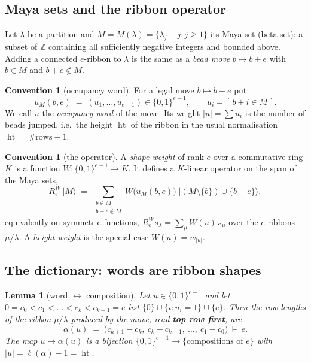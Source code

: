 \documentclass[11pt]{article}
\newtheorem{lemma}[theorem]{Lemma}
\theoremstyle{definition}
\newtheorem{convention}[theorem]{Convention}
\theoremstyle{remark}
\newcommand{\Z}{\mathbb{Z}}
\newcommand{\hgtt}{\operatorname{ht}}
\begin{document}
\subsection*{Maya sets and the ribbon operator}

Let $\lambda$ be a partition and $M=M(\lambda)=\{\lambda_j-j: j\ge1\}$ its Maya set (beta-set):
a subset of $\Z$ containing all sufficiently negative integers and bounded above.  Adding a
connected $e$-ribbon to $\lambda$ is the same as a \emph{bead move} $b\mapsto b+e$ with
$b\in M$ and $b+e\notin M$.

\begin{convention}[occupancy word]\label{conv:word}
For a legal move $b\mapsto b+e$ put
\[
   u_M(b,e)\;=\;(u_1,\dots,u_{e-1})\in\{0,1\}^{e-1},\qquad u_i=[\,b+i\in M\,].
\]
We call $u$ the \emph{occupancy word} of the move.  Its weight $|u|=\sum u_i$ is the
number of beads jumped, i.e.\ the height $\hgtt$ of the ribbon in the usual normalisation
$\hgtt=\#\text{rows}-1$.
\end{convention}

\begin{convention}[the operator]\label{conv:def}
A \emph{shape weight} of rank $e$ over a commutative ring $K$ is a function
$W:\{0,1\}^{e-1}\to K$.  It defines a $K$-linear operator on the span of the Maya sets,
\[
   R_e^{W}\,|M\rangle \;=\; \sum_{\substack{b\in M\\ b+e\notin M}}
       W\bigl(u_M(b,e)\bigr)\;\bigl|(M\setminus\{b\})\cup\{b+e\}\bigr\rangle ,
\]
equivalently on symmetric functions, $R_e^{W}s_\lambda=\sum_\mu W(u)\,s_\mu$ over the
$e$-ribbons $\mu/\lambda$.  A \emph{height weight} is the special case
$W(u)=w_{|u|}$.
\end{convention}

\subsection*{The dictionary: words are ribbon shapes}

\begin{lemma}[word $\leftrightarrow$ composition]\label{lem:dict}
Let $u\in\{0,1\}^{e-1}$ and let $0=c_0<c_1<\dots<c_k<c_{k+1}=e$ list
$\{0\}\cup\{i:u_i=1\}\cup\{e\}$.  Then the row lengths of the ribbon $\mu/\lambda$
produced by the move, read \textbf{top row first}, are
\[
  \alpha(u)\;=\;\bigl(c_{k+1}-c_k,\ c_k-c_{k-1},\ \dots,\ c_1-c_0\bigr)\ \models\ e .
\]
The map $u\mapsto\alpha(u)$ is a bijection $\{0,1\}^{e-1}\to\{\text{compositions of }e\}$
with $|u|=\ell(\alpha)-1=\hgtt$.
\end{lemma}
\end{document}
